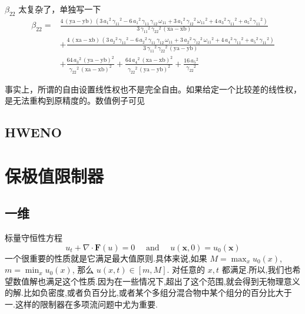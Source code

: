 \documentclass{book}
\begin{document}
$\beta_{22}$ 太复杂了，单独写一下
\begin{equation}
  \begin{aligned}
    \beta_{22} = & \frac{4\,{\left(\mathrm{ya}-\mathrm{yb}\right)}\,{\left(3\,{a_1 }^2 \,{\gamma_{11} }^2 -6\,{a_1 }^2 \,\gamma_{11} \,\gamma_{12} \,\omega_{11} +3\,{a_1 }^2 \,{\gamma_{12} }^2 \,{\omega_{11} }^2 +4\,{a_3 }^2 \,{\gamma_{11} }^2 +{a_5 }^2 \,{\gamma_{11} }^2 \right)}}{3\,{\gamma_{11} }^2 \,{\gamma_{22} }^2 \,{\left(\mathrm{xa}-\mathrm{xb}\right)}}  \\
                 & +\frac{4\,{\left(\mathrm{xa}-\mathrm{xb}\right)}\,{\left(3\,{a_2 }^2 \,{\gamma_{11} }^2 -6\,{a_2 }^2 \,\gamma_{11} \,\gamma_{12} \,\omega_{11} +3\,{a_2 }^2 \,{\gamma_{12} }^2 \,{\omega_{11} }^2 +4\,{a_4 }^2 \,{\gamma_{11} }^2 +{a_5 }^2 \,{\gamma_{11} }^2 \right)}}{3\,{\gamma_{11} }^2 \,{\gamma_{22} }^2 \,{\left(\mathrm{ya}-\mathrm{yb}\right)}} \\
                 & +\frac{64\,{a_3 }^2 \,{{\left(\mathrm{ya}-\mathrm{yb}\right)}}^2 }{{\gamma_{22} }^2 \,{{\left(\mathrm{xa}-\mathrm{xb}\right)}}^2 } + \frac{64\,{a_4 }^2 \,{{\left(\mathrm{xa}-\mathrm{xb}\right)}}^2 }{{\gamma_{22} }^2 \,{{\left(\mathrm{ya}-\mathrm{yb}\right)}}^2 }+\frac{16\,{a_5 }^2 }{{\gamma_{22} }^2 }
  \end{aligned}
\end{equation}

事实上，所谓的自由设置线性权也不是完全自由。如果给定一个比较差的线性权，是无法重构到原精度的。数值例子可见 \cite{RN133}

\subsection{HWENO}




\section{保极值限制器}
\subsection{一维}
\cite{RN6}
标量守恒性方程
\begin{equation}
  u_{t}+\nabla \cdot \mathbf{F}(u)=0 \quad \text { and } \quad u(\mathbf{x}, 0)=u_{0}(\mathbf{x})
\end{equation}
一个很重要的性质就是它满足最大值原则.具体来说,如果 $M=\max_x u_0(x)$,$m=\min_x u_0(x)$, 那么 $u(x,t)\in[m,M]$. 对任意的 $x,t$ 都满足.所以,我们也希望数值解也满足这个性质.因为在一些情况下,超出了这个范围,就会得到无物理意义的解.比如负密度,或者负百分比,或者某个多组分混合物中某个组分的百分比大于一.这样的限制器在多项流问题中尤为重要.\cite{PP-review}
\end{document}
